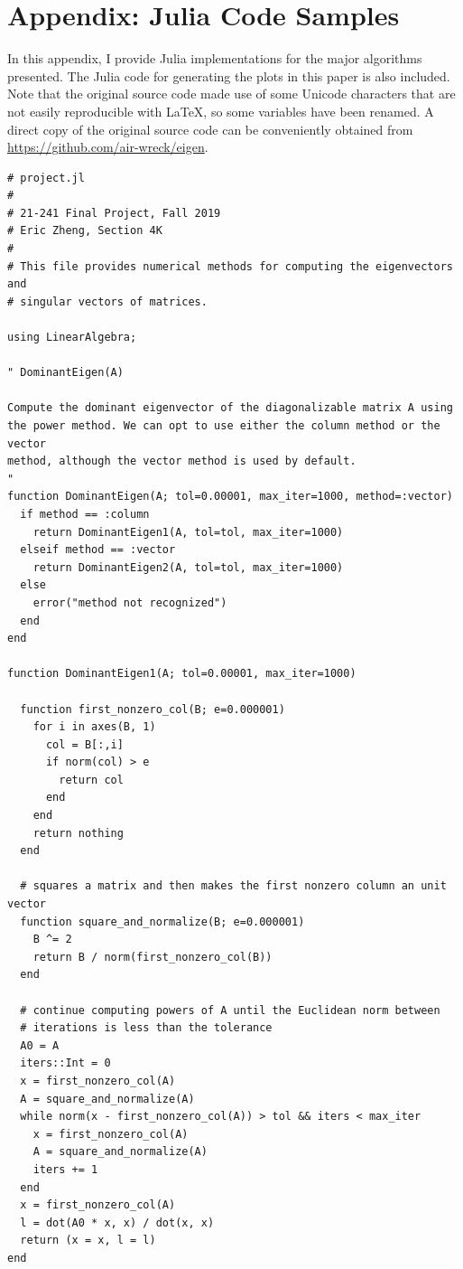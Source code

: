 \documentclass{article}
\begin{document}
\section{Appendix: Julia Code Samples}
In this appendix, I provide Julia implementations for the major algorithms presented. The Julia code for generating the plots in this paper is also included. Note that the original source code made use of some Unicode characters that are not easily reproducible with \LaTeX, so some variables have been renamed. A direct copy of the original source code can be conveniently obtained from \url{https://github.com/air-wreck/eigen}.

\begin{lstlisting}
# project.jl
#
# 21-241 Final Project, Fall 2019
# Eric Zheng, Section 4K
#
# This file provides numerical methods for computing the eigenvectors and
# singular vectors of matrices.

using LinearAlgebra;

" DominantEigen(A)

Compute the dominant eigenvector of the diagonalizable matrix A using
the power method. We can opt to use either the column method or the vector
method, although the vector method is used by default.
"
function DominantEigen(A; tol=0.00001, max_iter=1000, method=:vector)
  if method == :column
    return DominantEigen1(A, tol=tol, max_iter=1000)
  elseif method == :vector
    return DominantEigen2(A, tol=tol, max_iter=1000)
  else
    error("method not recognized")
  end
end

function DominantEigen1(A; tol=0.00001, max_iter=1000)

  function first_nonzero_col(B; e=0.000001)
    for i in axes(B, 1)
      col = B[:,i]
      if norm(col) > e
        return col
      end
    end
    return nothing
  end

  # squares a matrix and then makes the first nonzero column an unit vector
  function square_and_normalize(B; e=0.000001)
    B ^= 2
    return B / norm(first_nonzero_col(B))
  end

  # continue computing powers of A until the Euclidean norm between
  # iterations is less than the tolerance
  A0 = A
  iters::Int = 0
  x = first_nonzero_col(A)
  A = square_and_normalize(A)
  while norm(x - first_nonzero_col(A)) > tol && iters < max_iter
    x = first_nonzero_col(A)
    A = square_and_normalize(A)
    iters += 1
  end
  x = first_nonzero_col(A)
  l = dot(A0 * x, x) / dot(x, x)
  return (x = x, l = l)
end


\end{lstlisting}
\end{document}
